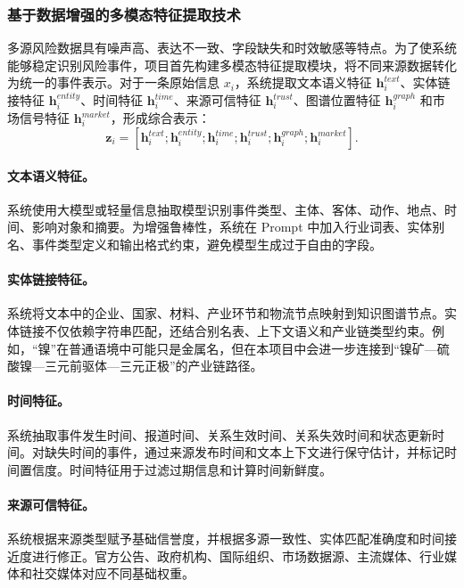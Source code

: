 ﻿\documentclass[12pt,a4paper]{article}
\begin{document}
\subsubsection{基于数据增强的多模态特征提取技术}

多源风险数据具有噪声高、表达不一致、字段缺失和时效敏感等特点。为了使系统能够稳定识别风险事件，项目首先构建多模态特征提取模块，将不同来源数据转化为统一的事件表示。对于一条原始信息 $x_i$，系统提取文本语义特征 $\bm{h}^{text}_i$、实体链接特征 $\bm{h}^{entity}_i$、时间特征 $\bm{h}^{time}_i$、来源可信特征 $\bm{h}^{trust}_i$、图谱位置特征 $\bm{h}^{graph}_i$ 和市场信号特征 $\bm{h}^{market}_i$，形成综合表示：
\begin{equation}
\bm{z}_i = \left[\bm{h}^{text}_i;\bm{h}^{entity}_i;\bm{h}^{time}_i;\bm{h}^{trust}_i;\bm{h}^{graph}_i;\bm{h}^{market}_i\right].
\end{equation}

\paragraph{文本语义特征。}系统使用大模型或轻量信息抽取模型识别事件类型、主体、客体、动作、地点、时间、影响对象和摘要。为增强鲁棒性，系统在 Prompt 中加入行业词表、实体别名、事件类型定义和输出格式约束，避免模型生成过于自由的字段。

\paragraph{实体链接特征。}系统将文本中的企业、国家、材料、产业环节和物流节点映射到知识图谱节点。实体链接不仅依赖字符串匹配，还结合别名表、上下文语义和产业链类型约束。例如，“镍”在普通语境中可能只是金属名，但在本项目中会进一步连接到“镍矿—硫酸镍—三元前驱体—三元正极”的产业链路径。

\paragraph{时间特征。}系统抽取事件发生时间、报道时间、关系生效时间、关系失效时间和状态更新时间。对缺失时间的事件，通过来源发布时间和文本上下文进行保守估计，并标记时间置信度。时间特征用于过滤过期信息和计算时间新鲜度。

\paragraph{来源可信特征。}系统根据来源类型赋予基础信誉度，并根据多源一致性、实体匹配准确度和时间接近度进行修正。官方公告、政府机构、国际组织、市场数据源、主流媒体、行业媒体和社交媒体对应不同基础权重。
\end{document}
